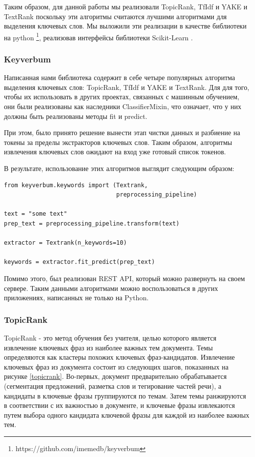 \documentclass[14pt]{matmex-diploma-custom}
\begin{document}
Таким образом, для данной работы мы реализовали TopicRank, TfIdf и YAKE и TextRank поскольку эти алгоритмы считаются лучшими алгоритмами для выделения ключевых слов. Мы выложили эти реализации в качестве библиотеки на python \footnote{https://github.com/imemedb/keyverbum}, реализовав интерфейсы библиотеки Scikit-Learn \cite{scikit-learn, sklearn_api}.

\subsubsection{Keyverbum}
Написанная нами библиотека содержит в себе четыре популярных алгоритма выделения ключевых слов: TopicRank, TfIdf и YAKE и TextRank.
Для для того, чтобы их использовать в других проектах, связанных с машинным обучением, они были реализованы как наследники
ClassifierMixin, что означает, что у них должны быть реализованы методы fit и predict.

При этом, было принято решение вынести этап чистки данных и разбиение на токены за пределы экстракторов ключевых слов.
Таким образом, алгоритмы извлечения ключевых слов ожидают на вход уже готовый список токенов.

В результате, использование этих алгоритмов выглядит следующим образом:

\begin{verbatim}
from keyverbum.keywords import (Textrank, 
                                preprocessing_pipeline)

text = "some text"
prep_text = preprocessing_pipeline.transform(text)

extractor = Textrank(n_keywords=10)

keywords = extractor.fit_predict(prep_text)

\end{verbatim}

Помимо этого, был реализован REST API, который можно развернуть на своем сервере.
Таким данными алгоритмами можно воспользоваться в других приложениях, написанных не
только на Python.


\subsubsection{TopicRank}
TopicRank - это метод обучения без учителя, целью которого является извлечение ключевых фраз из наиболее важных тем документа. Темы определяются как кластеры похожих ключевых фраз-кандидатов. Извлечение ключевых фраз из документа состоит из следующих шагов, показанных на рисунке \ref{topicrank}. Во-первых, документ предварительно обрабатывается (сегментация предложений, разметка слов и тегирование частей речи), а кандидаты в ключевые фразы группируются по темам. Затем темы ранжируются в соответствии с их важностью в документе, и ключевые фразы извлекаются путем выбора одного кандидата ключевой фразы для каждой из наиболее важных тем.
\end{document}
